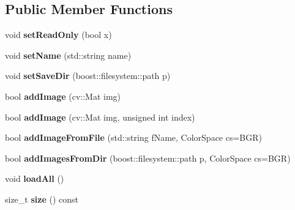 \subsection*{Public Member Functions}
\begin{DoxyCompactItemize}
\item 
void {\bfseries set\+Read\+Only} (bool x)\hypertarget{classImageList_a9abadb57460441240166901a0b8994cb}{}\label{classImageList_a9abadb57460441240166901a0b8994cb}

\item 
void {\bfseries set\+Name} (std\+::string name)\hypertarget{classImageList_a790da2148cf5c1a99a16c398d5cf32b5}{}\label{classImageList_a790da2148cf5c1a99a16c398d5cf32b5}

\item 
void {\bfseries set\+Save\+Dir} (boost\+::filesystem\+::path p)\hypertarget{classImageList_a52c145334f0090f48805dd2c4d09d2e5}{}\label{classImageList_a52c145334f0090f48805dd2c4d09d2e5}

\item 
bool {\bfseries add\+Image} (cv\+::\+Mat img)\hypertarget{classImageList_aab2a4a06d796c6351a7e3c6289825245}{}\label{classImageList_aab2a4a06d796c6351a7e3c6289825245}

\item 
bool {\bfseries add\+Image} (cv\+::\+Mat img, unsigned int index)\hypertarget{classImageList_a5a9a560ec68b0606924bee2c4b84733f}{}\label{classImageList_a5a9a560ec68b0606924bee2c4b84733f}

\item 
bool {\bfseries add\+Image\+From\+File} (std\+::string f\+Name, Color\+Space cs=B\+GR)\hypertarget{classImageList_ae8092361c5a3615e4a0a9e5707b47d59}{}\label{classImageList_ae8092361c5a3615e4a0a9e5707b47d59}

\item 
bool {\bfseries add\+Images\+From\+Dir} (boost\+::filesystem\+::path p, Color\+Space cs=B\+GR)\hypertarget{classImageList_a20c7df9d1e81e9161d012e16027a4913}{}\label{classImageList_a20c7df9d1e81e9161d012e16027a4913}

\item 
void {\bfseries load\+All} ()\hypertarget{classImageList_a1965a189a9e9376582b9756b0b9cb08d}{}\label{classImageList_a1965a189a9e9376582b9756b0b9cb08d}

\item 
size\+\_\+t {\bfseries size} () const \hypertarget{classImageList_ac155eb69034ed8650256296cce2b2e2d}{}\label{classImageList_ac155eb69034ed8650256296cce2b2e2d}


\end{DoxyCompactItemize}
